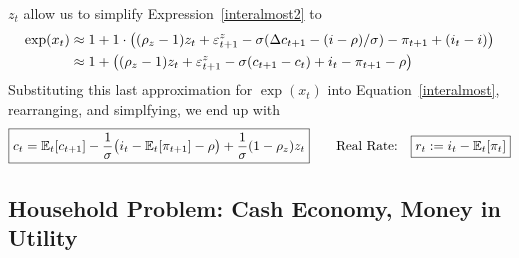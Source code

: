 \documentclass[12pt]{article}
\theoremstyle{plain}
\theoremstyle{definition}
\theoremstyle{remark}
\newcommand{\E}{\mathbb{E}}
\begin{document}
\begin{itemize}
    $z_t$ allow us to simplify Expression~\ref{interalmost2} to
    \begin{align}
      \exp(x_t)
      &\approx 1 + 1\cdot\big(
        (\rho_z-1)z_t+\varepsilon_{t+1}^z
        -\sigma (\Delta c_{t+1}-(i-\rho)/\sigma)
        - \pi_{t+1}
        + (i_t-i)
      \big)
      \notag
      \\
      &\approx 1 + \big(
        (\rho_z-1)z_t+\varepsilon_{t+1}^z
        -\sigma (c_{t+1}-c_t)
        + i_t
        - \pi_{t+1}
        - \rho
      \big)
      \label{interalmost3}
    \end{align}
    Substituting this last approximation for $\exp(x_t)$ into
    Equation~\ref{interalmost}, rearranging, and simplfying, we end up
    with
    \begin{align*}
      \boxed{%
      c_{t}
      =
      \E_t[c_{t+1}]
      -
      \frac{1}{\sigma}
      \big(
      i_t-\E_t[\pi_{t+1}]
      -\rho
      \big)
      +
      \frac{1}{\sigma}
      (1-\rho_z) z_t
      }
      \qquad\text{Real Rate:}\quad
      \boxed{ r_t:=i_t-\E_t[\pi_t] }
    \end{align*}
\end{itemize}

\clearpage
\subsection{Household Problem: Cash Economy, Money in Utility}
\end{document}
